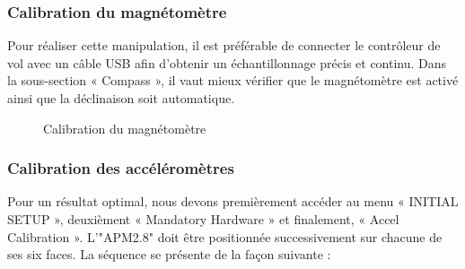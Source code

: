 	\subsubsection{Calibration du magnétomètre}
	Pour réaliser cette manipulation, il est préférable de connecter le contrôleur de vol avec un câble USB afin d'obtenir un échantillonnage précis et continu.
	Dans la sous-section « Compass », il vaut mieux vérifier que le magnétomètre est activé ainsi que la déclinaison soit automatique.
	
	\begin{figure}[H]
		\begin{center}
			\centering
			\vskip 1cm
		\end{center}
		\caption{Calibration du magnétomètre}
	\end{figure}
	\vskip 1cm
	\subsubsection{Calibration des accéléromètres}
	Pour un résultat optimal,  nous devons premièrement  accéder au menu « INITIAL SETUP », deuxièment « Mandatory Hardware » et finalement, « Accel Calibration ». L'"APM2.8" doit être positionnée successivement sur chacune de ses six faces.
	La séquence se présente de la façon suivante :
	
